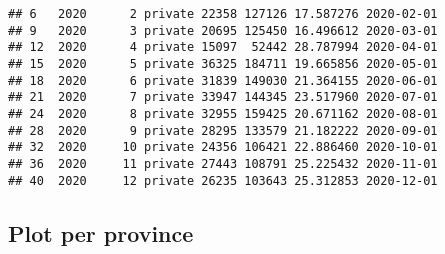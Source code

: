 \documentclass[
]{article}
\begin{document}
\begin{verbatim}
## 6   2020      2 private 22358 127126 17.587276 2020-02-01
## 9   2020      3 private 20695 125450 16.496612 2020-03-01
## 12  2020      4 private 15097  52442 28.787994 2020-04-01
## 15  2020      5 private 36325 184711 19.665856 2020-05-01
## 18  2020      6 private 31839 149030 21.364155 2020-06-01
## 21  2020      7 private 33947 144345 23.517960 2020-07-01
## 24  2020      8 private 32955 159425 20.671162 2020-08-01
## 28  2020      9 private 28295 133579 21.182222 2020-09-01
## 32  2020     10 private 24356 106421 22.886460 2020-10-01
## 36  2020     11 private 27443 108791 25.225432 2020-11-01
## 40  2020     12 private 26235 103643 25.312853 2020-12-01
\end{verbatim}

\hypertarget{plot-per-province}{%
\subsection{Plot per province}\label{plot-per-province}}
\end{document}
